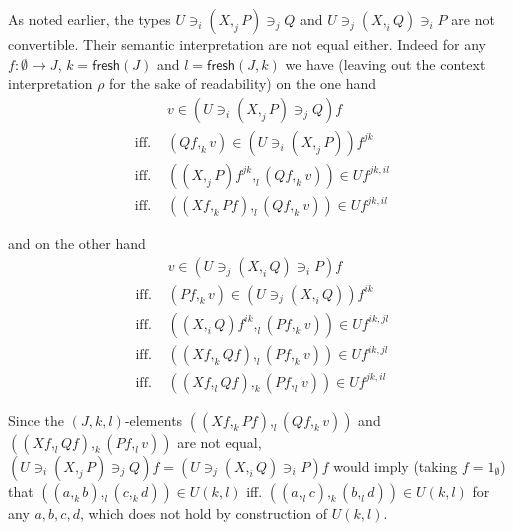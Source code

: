 \documentclass[english]{PaperTools/latex/lipics}
\newcommand\op[1]{∋_{#1}}
\def\fresh#1{\mathsf{fresh}(#1)}
\begin{document}
\begin{remark}
  As noted earlier, the types
  $U \op i (X ,_j P) \op j Q$ and $U \op j (X ,_i Q) \op i P$
  are not convertible.
  Their semantic interpretation are not equal either.  Indeed
  for any $f : ∅ → J$, $k = \fresh J$ and $l = \fresh{J,k}$
  we have
  (leaving out the context interpretation $ρ$ for the sake of
  readability)
  on the one hand
  \begin{align*}
    &v ∈ (U \op i (X ,_j P) \op j Q) f
    \\
    \text{ iff. }& (Qf ,_k v) ∈ (U \op i (X ,_j P))f^{jk}
    \\
    \text{ iff. }& ((X ,_j P)f^{jk} ,_l (Qf ,_k v)) ∈ Uf^{jk,il}
    \\
    \text{ iff. }& ((Xf ,_k Pf) ,_l (Qf ,_k v)) ∈ Uf^{jk,il}
  \end{align*}

  and on the other hand
  \begin{align*}
    &v ∈ (U \op j (X ,_i Q) \op i P) f
    \\
    \text{ iff. }& (Pf ,_k v) ∈ (U \op j (X ,_i Q))f^{ik}
    \\
    \text{ iff. }& ((X ,_i Q)f^{ik} ,_l (Pf ,_k v)) ∈ Uf^{ik,jl}
    \\
    \text{ iff. }& ((Xf ,_k Qf) ,_l (Pf ,_k v)) ∈ Uf^{ik,jl}
    \\
    \text{ iff. }& ((Xf ,_l Qf) ,_k (Pf ,_l v)) ∈ Uf^{jk,il}
  \end{align*}

  Since the $(J,k,l)$-elements $((Xf ,_k Pf) ,_l (Qf ,_k v))$ and
  $((Xf ,_l Qf) ,_k (Pf ,_l v))$ are not equal,
  $(U \op i (X ,_j P) \op j Q) f = (U \op j (X ,_i Q) \op i P) f$
  would imply (taking $f=1_∅$) that
  $((a ,_k b) ,_l (c ,_k d)) ∈ U(k,l)$ iff.
  $((a ,_l c) ,_k (b ,_l d)) ∈ U(k,l)$ for any $a,b,c,d$, which does not
  hold by construction of $U(k,l)$.
\end{remark}
\end{document}
